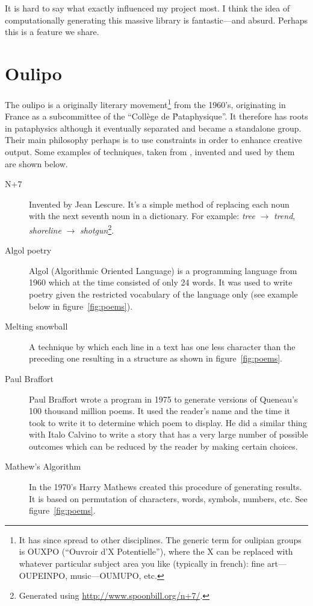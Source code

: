 It is hard to say what exactly influenced my project most. I think the idea of computationally generating this massive library is fantastic---and absurd. Perhaps this is a feature we share.


\section{Oulipo}
\label{s:oulipo}

The \gls{oulipo} is a originally literary movement\footnote{It has since spread to other disciplines. The generic term for oulipian groups is OUXPO (``Ouvroir d'X Potentielle''), where the X can be replaced with whatever particular subject area you like (typically in french): fine art---OUPEINPO, music---OUMUPO, etc.} from the 1960's, originating in France as a subcommittee of the ``Coll\`{e}ge de \'Pataphysique''. It therefore has roots in pataphysics although it eventually separated and became a standalone group. Their main philosophy perhaps is to use constraints in order to enhance creative output. Some examples of techniques, taken from \autocite{Mathews2005}, invented and used by them are shown below.

\begin{description}
  \item[N+7] Invented by Jean Lescure. It's a simple method of replacing each noun with the next seventh noun in a dictionary. For example: \emph{tree} $\rightarrow$ \emph{trend}, \emph{shoreline} $\rightarrow$ \emph{shotgun}\footnote{Generated using \url{http://www.spoonbill.org/n+7/}.}.
  \item[Algol poetry] Algol (Algorithmic Oriented Language) is a programming language from 1960 which at the time consisted of only 24 words. It was used to write poetry given the restricted vocabulary of the language only (see example below in figure~\ref{fig:poems}).
  \item[Melting snowball] A technique by which each line in a text has one less character than the preceding one resulting in a structure as shown in figure~\ref{fig:poems}.
  \item[Paul Braffort] Paul Braffort wrote a program in 1975 to generate versions of Queneau's 100 thousand million poems. It used the reader's name and the time it took to write it to determine which poem to display. He did a similar thing with Italo Calvino to write a story that has a very large number of possible outcomes which can be reduced by the reader by making certain choices.
  \item[Mathew's Algorithm] In the 1970's Harry Mathews created this procedure of generating results. It is based on permutation of characters, words, symbols, numbers, etc. See figure~\ref{fig:poems}.
\end{description}

